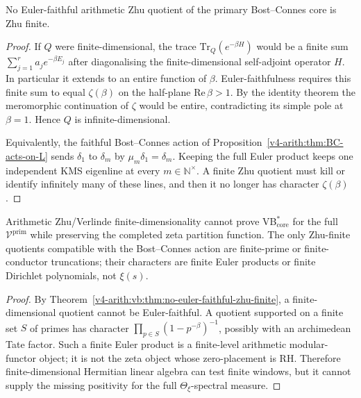 \begin{theorem}
\label{v4-arith:vb:thm:no-euler-faithful-zhu-finite}
No Euler-faithful arithmetic Zhu quotient of
the primary Bost--Connes core is Zhu finite.
\end{theorem}

\begin{proof}
If \(Q\) were finite-dimensional, the trace
\(\mathrm{Tr}_{Q}(e^{-\beta H})\) would be a finite sum
\(\sum_{j=1}^{r}a_{j}e^{-\beta E_{j}}\) after diagonalising the
finite-dimensional self-adjoint operator \(H\). In particular it extends to an
entire function of \(\beta\). Euler-faithfulness requires this finite
sum to equal \(\zeta(\beta)\) on the half-plane
\(\mathrm{Re}\,\beta>1\). By the identity theorem the meromorphic
continuation of \(\zeta\) would be entire, contradicting its simple
pole at \(\beta=1\). Hence \(Q\) is infinite-dimensional.

Equivalently, the faithful Bost--Connes action of
Proposition~\ref{v4-arith:thm:BC-acts-on-L} sends
\(\delta_{1}\) to \(\delta_{m}\) by \(\mu_{m}\delta_{1}=\delta_{m}\).
Keeping the full Euler product keeps one independent KMS eigenline at
every \(m\in\mathbb{N}^{\times}\). A finite Zhu quotient must kill or
identify infinitely many of these lines, and then it no longer has
character \(\zeta(\beta)\).
\end{proof}

\begin{corollary}
\label{v4-arith:vb:cor:verlinde-shortcut-fails}
Arithmetic Zhu/Verlinde finite-dimensionality
cannot prove VB\(^{*}_{\mathrm{core}}\) for the full
\(\mathcal{V}^{\mathrm{prim}}\) while preserving the completed zeta
partition function. The only Zhu-finite quotients compatible with the
Bost--Connes action are finite-prime or finite-conductor truncations;
their characters are finite Euler products or finite Dirichlet
polynomials, not \(\xi(s)\).
\end{corollary}

\begin{proof}
By Theorem~\ref{v4-arith:vb:thm:no-euler-faithful-zhu-finite}, a
finite-dimensional quotient cannot be Euler-faithful. A quotient
supported on a finite set \(S\) of primes has character
\(\prod_{p\in S}(1-p^{-\beta})^{-1}\), possibly with an archimedean
Tate factor. Such a finite Euler product is a finite-level arithmetic
modular-functor object; it is not the zeta object whose zero-placement
is RH. Therefore finite-dimensional Hermitian linear algebra can test
finite windows, but it cannot supply the missing positivity for the
full \(\Theta_{\xi}\)-spectral measure.
\end{proof}

